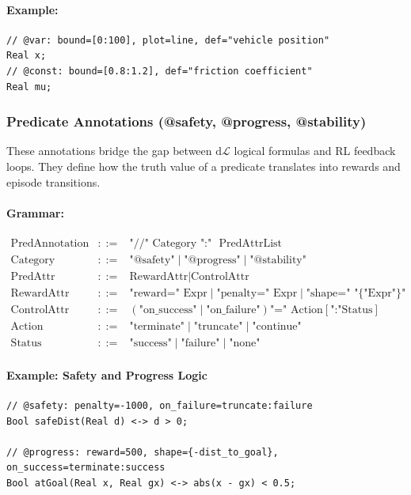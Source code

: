\documentclass{article}
\begin{document}
\paragraph{Example:}
\begin{verbatim}
// @var: bound=[0:100], plot=line, def="vehicle position"
Real x;
// @const: bound=[0.8:1.2], def="friction coefficient"
Real mu;
\end{verbatim}

\subsubsection{Predicate Annotations (@safety, @progress, @stability)}
These annotations bridge the gap between $\text{d}\mathcal{L}$ logical formulas and RL feedback loops. They define how the truth value of a predicate translates into rewards and episode transitions.

\paragraph{Grammar:}
\[
\begin{array}{lcl}
\text{PredAnnotation} & ::= & \text{"//"} \text{ Category} \text{ ":" } \text{ PredAttrList} \\
\text{Category}       & ::= & \text{"@safety"} \mid \text{"@progress"} \mid \text{"@stability"} \\
\text{PredAttr}       & ::= & \text{RewardAttr} \mid \text{ControlAttr} \\
\text{RewardAttr}     & ::= & \text{"reward=" } \text{Expr} \mid \text{"penalty=" } \text{Expr} \mid \text{"shape=" } \text{"\{"} \text{Expr} \text{"\}"} \\
\text{ControlAttr}    & ::= & (\text{"on\_success"} \mid \text{"on\_failure"}) \text{"=" } \text{Action} [\text{":"} \text{Status}] \\
\text{Action}         & ::= & \text{"terminate"} \mid \text{"truncate"} \mid \text{"continue"} \\
\text{Status}         & ::= & \text{"success"} \mid \text{"failure"} \mid \text{"none"}
\end{array}
\]

\paragraph{Example: Safety and Progress Logic}
\begin{verbatim}
// @safety: penalty=-1000, on_failure=truncate:failure
Bool safeDist(Real d) <-> d > 0;

// @progress: reward=500, shape={-dist_to_goal}, on_success=terminate:success
Bool atGoal(Real x, Real gx) <-> abs(x - gx) < 0.5;
\end{verbatim}
\end{document}
